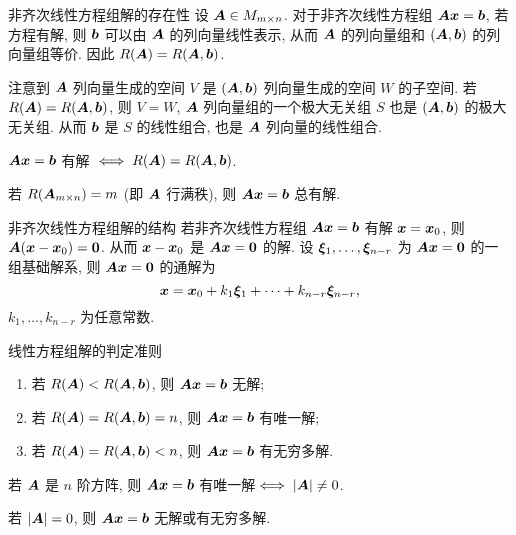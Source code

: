 \begin{frame}{非齐次线性方程组解的存在性}
	\onslide<+->
	设 $\bfA\in M_{m\times n}$.
	\onslide<+->
	对于非齐次线性方程组 $\bfA\bfx=\bfb$,
	\onslide<+->
	若方程有解, 则 $\bfb$ 可以由 $\bfA$ 的列向量线性表示, 从而 $\bfA$ 的列向量组和 $(\bfA,\bfb)$ 的列向量组等价.
	\onslide<+->
	因此 $R(\bfA)=R(\bfA,\bfb)$.

	\onslide<+->
	注意到 $\bfA$ 列向量生成的空间 $V$ 是 $(\bfA,\bfb)$ 列向量生成的空间 $W$ 的子空间.
	\onslide<+->
	若 $R(\bfA)=R(\bfA,\bfb)$, 则 $V=W$, $\bfA$ 列向量组的一个极大无关组 $S$ 也是 $(\bfA,\bfb)$ 的极大无关组.
	\onslide<+->
	从而 $\bfb$ 是 $S$ 的线性组合, 也是 $\bfA$ 列向量的线性组合.

	\onslide<+->
	\begin{theorem}
		$\bfA \bfx=\bfb$ 有解 $\iff R(\bfA)=R(\bfA,\bfb)$.
	\end{theorem}
	\onslide<+->
	\begin{corollary}
		若 $R(\bfA_{m\times n})=m$ (即 $\bfA$ 行满秩), 则 $\bfA \bfx=\bfb$ 总有解.
	\end{corollary}
\end{frame}


\begin{frame}{非齐次线性方程组解的结构}
	\onslide<+->
	若非齐次线性方程组 $\bfA\bfx=\bfb$ 有解 $\bfx=\bfx_0$,
	则 $\bfA(\bfx-\bfx_0)={\bf0}$.
	\onslide<+->
	从而 $\bfx-\bfx_0$ 是 $\bfA\bfx={\bf0}$ 的解.
	\onslide<+->
	设 $\bmx_1,\dots,\bmx_{n-r}$ 为 $\bfA\bfx={\bf0}$ 的一组基础解系, 则 $\bfA\bfx={\bf0}$ 的通解为
	\[\bfx=\bfx_0+k_1\bmx_1+\cdots+k_{n-r}\bmx_{n-r},\]
	$k_1,\dots,k_{n-r}$ 为任意常数.

	\onslide<+->
	\begin{second}{线性方程组解的判定准则}
		\begin{enumerate}
			\item 若 $R(\bfA)<R(\bfA,\bfb)$, 则 $\bfA \bfx=\bfb$ 无解;
			\item 若 $R(\bfA)=R(\bfA,\bfb)=n$, 则 $\bfA \bfx=\bfb$ 有唯一解;
			\item 若 $R(\bfA)=R(\bfA,\bfb)<n$, 则 $\bfA \bfx=\bfb$ 有无穷多解.
		\end{enumerate}
	\end{second}
	\onslide<+->
	\begin{corollary}
		若 $\bfA$ 是 $n$ 阶方阵, 则 $\bfA\bfx=\bfb$ 有唯一解$\iff|\bfA|\neq0$.
	\end{corollary}
	\onslide<+->
	若 $|\bfA|=0$, 则 $\bfA\bfx=\bfb$ 无解或有无穷多解.
\end{frame}


